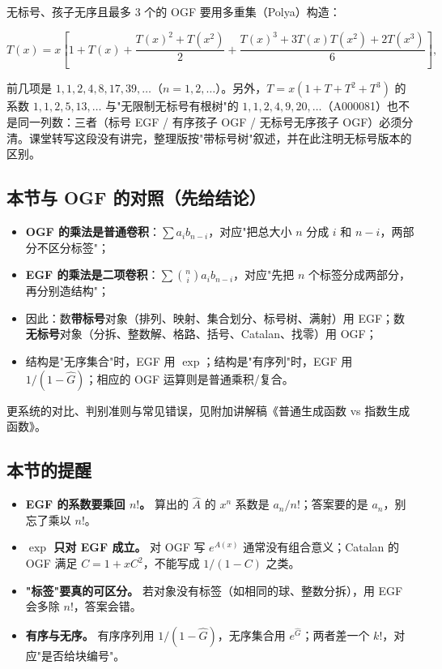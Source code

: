 无标号、孩子无序且最多 $3$ 个的 OGF 要用多重集（Polya）构造：

\[
T(x)=x\left[1+T(x)+\frac{T(x)^2+T(x^2)}{2}+\frac{T(x)^3+3T(x)T(x^2)+2T(x^3)}{6}\right],
\]

前几项是 $1,1,2,4,8,17,39,\dots$（$n=1,2,\dots$）。另外，$T=x(1+T+T^2+T^3)$ 的系数 $1,1,2,5,13,\dots$ 与"无限制无标号有根树"的 $1,1,2,4,9,20,\dots$（A000081）也不是同一列数：三者（标号 EGF / 有序孩子 OGF / 无标号无序孩子 OGF）必须分清。课堂转写这段没有讲完，整理版按"带标号树"叙述，并在此注明无标号版本的区别。

\subsection{本节与 OGF 的对照（先给结论）}


\begin{itemize}
\item \textbf{OGF 的乘法是普通卷积}：$\sum a_ib_{n-i}$，对应"把总大小 $n$ 分成 $i$ 和 $n-i$，两部分不区分标签"；
\item \textbf{EGF 的乘法是二项卷积}：$\sum\binom ni a_ib_{n-i}$，对应"先把 $n$ 个标签分成两部分，再分别造结构"；
\item 因此：数\textbf{带标号}对象（排列、映射、集合划分、标号树、满射）用 EGF；数\textbf{无标号}对象（分拆、整数解、格路、括号、Catalan、找零）用 OGF；
\item 结构是"无序集合"时，EGF 用 $\exp$；结构是"有序列"时，EGF 用 $1/(1-\hat G)$；相应的 OGF 运算则是普通乘积/复合。
\end{itemize}


更系统的对比、判别准则与常见错误，见附加讲解稿《普通生成函数 vs 指数生成函数》。

\subsection{本节的提醒}


\begin{itemize}
\item \textbf{EGF 的系数要乘回 $n!$。} 算出的 $\hat A$ 的 $x^n$ 系数是 $a_n/n!$；答案要的是 $a_n$，别忘了乘以 $n!$。
\item \textbf{$\exp$ 只对 EGF 成立。} 对 OGF 写 $e^{A(x)}$ 通常没有组合意义；Catalan 的 OGF 满足 $C=1+xC^2$，不能写成 $1/(1-C)$ 之类。
\item \textbf{"标签"要真的可区分。} 若对象没有标签（如相同的球、整数分拆），用 EGF 会多除 $n!$，答案会错。
\item \textbf{有序与无序。} 有序序列用 $1/(1-\hat G)$，无序集合用 $e^{\hat G}$；两者差一个 $k!$，对应"是否给块编号"。
\end{itemize}
